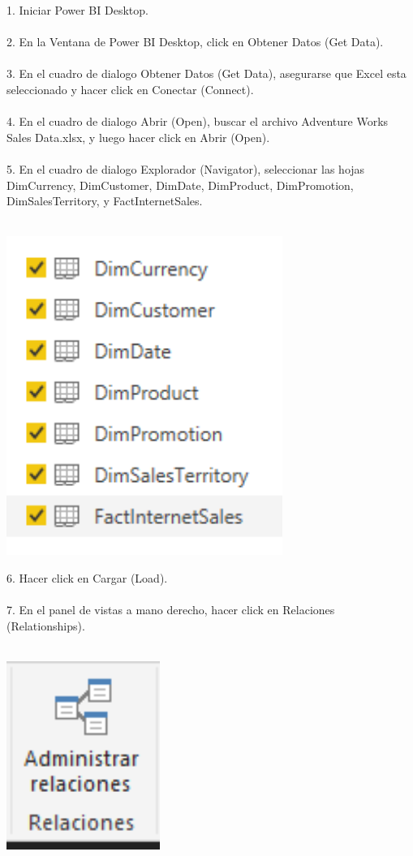\documentclass[12pt,letterpaper]{article}
\begin{document}
1. Iniciar Power BI Desktop.\\\\ 
2. En la Ventana de Power BI Desktop, click en Obtener Datos (Get Data).\\\\ 
3. En el cuadro de dialogo Obtener Datos (Get Data), asegurarse que Excel esta seleccionado y hacer click en Conectar (Connect).\\\\ 
4. En el cuadro de dialogo Abrir (Open), buscar el archivo Adventure Works Sales Data.xlsx, y luego hacer click en Abrir (Open).\\\\ 
5. En el cuadro de dialogo Explorador (Navigator), seleccionar las hojas DimCurrency, DimCustomer, DimDate, DimProduct, DimPromotion, DimSalesTerritory, y FactInternetSales.\\\\ 
\begin{center}
\includegraphics[width=9cm]{IMG/2.png} 
\end{center}
6. Hacer click en Cargar (Load).\\\\ 
7. En el panel de vistas a mano derecho, hacer click en Relaciones (Relationships).\\\\ 
\begin{center}
\includegraphics[width=5cm]{IMG/3.png} 
\end{center}
\end{document}
